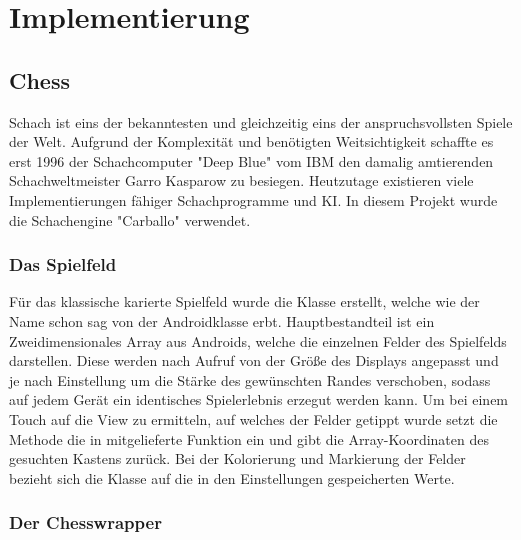 \chapter{Implementierung}

\section{Chess}
\sectionauthor{\oliver}

Schach ist eins der bekanntesten und gleichzeitig eins der anspruchsvollsten
Spiele der Welt. Aufgrund der Komplexität und benötigten Weitsichtigkeit
schaffte es erst 1996 der Schachcomputer "Deep Blue" vom IBM den damalig
amtierenden Schachweltmeister Garro Kasparow zu besiegen. 
Heutzutage existieren viele Implementierungen fähiger Schachprogramme und KI.
In diesem Projekt wurde die Schachengine "Carballo" verwendet.  

\subsection{Das Spielfeld}

Für das klassische karierte Spielfeld wurde die Klasse
 erstellt, welche wie der Name schon sag von der
Androidklasse  erbt. Hauptbestandteil ist ein Zweidimensionales
Array aus Androids, welche die einzelnen Felder des Spielfelds
darstellen. Diese werden nach Aufruf von  der Größe des
Displays angepasst und je nach Einstellung um die Stärke des gewünschten Randes
verschoben, sodass auf jedem Gerät ein identisches Spielerlebnis erzegut werden
kann. Um bei einem Touch auf die View zu ermitteln, auf welches der Felder
getippt wurde setzt die Methode  die in
 mitgelieferte Funktion  ein und gibt
die Array-Koordinaten des gesuchten Kastens zurück. Bei der Kolorierung und
Markierung der Felder bezieht sich die Klasse auf die in den Einstellungen
gespeicherten Werte.

\subsection{Der Chesswrapper}


